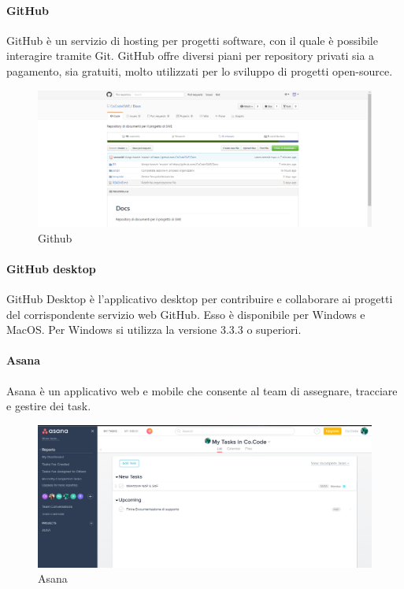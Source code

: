  \paragraph{GitHub}
 GitHub è un servizio di hosting per progetti software, con il quale è possibile interagire tramite Git. GitHub
offre diversi piani per repository privati sia a pagamento, sia gratuiti, molto utilizzati per lo
sviluppo di progetti open-source. 
\begin{figure}[h]
\centering
\includegraphics[scale=0.4]{img/github.png}
\caption{Github}\label{sec:Figura4}
\end{figure}
 \paragraph{GitHub desktop}
 GitHub Desktop è l'applicativo desktop per contribuire e collaborare ai progetti del corrispondente servizio web GitHub. Esso è disponibile per Windows e MacOS. Per Windows si utilizza la versione 3.3.3 o superiori.
 \paragraph{Asana}
 Asana è un applicativo web e mobile che consente al team di assegnare, tracciare e gestire dei task.
\begin{figure}[h]
\centering
\includegraphics[scale=0.4]{img/asana.png}
\caption{Asana}\label{sec:Figura5}
\end{figure}
